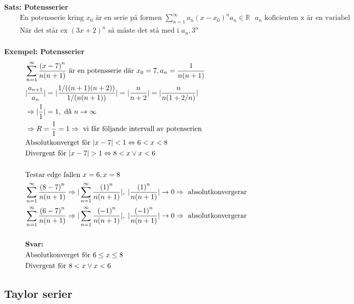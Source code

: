 \documentclass{article}
\begin{document}
\textbf{Sats: Potensserier}
\begin{align*}
  &\quad  \text{En potensserie kring } x_0 \text{ är en serie på formen }
  \displaystyle\sum_{n=1}^{\infty}a_n{(x-x_0)}^n a_n \in \mathbb{R} \text{ $a_n$ koficienten x är en variabel} \\
  &\quad  \text{När det står ex } {(3x+2)}^n \text{ så måste det stå med i } a_n, 3^n \\
\end{align*}

\textbf{Exempel: Potensserier}
\begin{align*}
  &\quad  \displaystyle\sum_{n=1}^{\infty}\frac{{(x-7)}^n}{n(n+1)} \text{ är en potensserie där } 
  x_0=7, a_n=\frac{1}{n(n+1)} \\
  &\quad  |\frac{a_{n+1}}{a_n}| = |\frac{1/((n+1)(n+2))}{1/(n(n+1))}| = |\frac{n}{n+2}| =
  |\frac{n}{n(1+2/n)}| \\
  &\quad  \Rightarrow |\frac{1}{1}| = 1, \text{ då } n \to \infty \\
  &\quad  \Rightarrow R=\frac{1}{1}=1 \Rightarrow \text{ vi får följande intervall av potenserien} \\
  &\quad  \text{Absolutkonverget för } |x-7|<1 \Leftrightarrow 6<x<8 \\
  &\quad  \text{Divergent för } |x-7|>1 \Leftrightarrow 8<x \lor x<6 \\
  &\quad  \\
  &\quad  \text{Testar edge fallen } x=6, x=8 \\
  &\quad  \displaystyle\sum_{n=1}^{\infty}\frac{{(8-7)}^n}{n(n+1)} \Rightarrow
  |\displaystyle\sum_{n=1}^{\infty}\frac{{(1)}^n}{n(n+1)}|, \; |\frac{{(1)}^n}{n(n+1)}|\to0
  \Rightarrow \text{ absolutkonvergerar} \\
  &\quad  \displaystyle\sum_{n=1}^{\infty}\frac{{(6-7)}^n}{n(n+1)} \Rightarrow
  |\displaystyle\sum_{n=1}^{\infty}\frac{{(-1)}^n}{n(n+1)}|, \; |\frac{{(-1)}^n}{n(n+1)}|\to0
  \Rightarrow \text{ absolutkonvergerar} \\
  &\quad  \\
  &\quad  \text{\textbf{Svar:} } \\
  &\quad  \text{Absolutkonverget för } 6\leq x\leq 8 \\
  &\quad  \text{Divergent för } 8<x \lor x<6 \\
\end{align*}


\subsection{Taylor serier}
\end{document}
